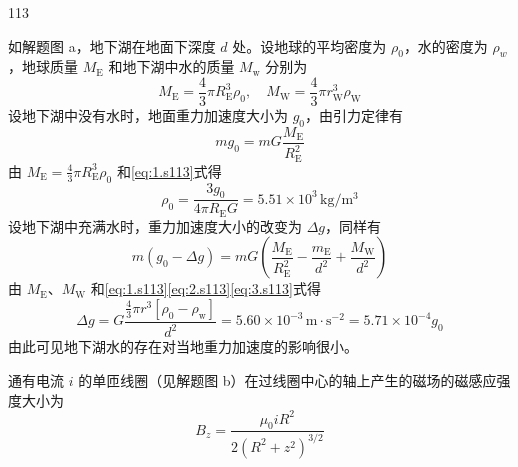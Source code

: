 \begin{solution}{113}
    \begin{subsolution}
        如解题图 a，地下湖在地面下深度 $d$ 处。设地球的平均密度为 $\rho_{0}$，水的密度为 $\rho_{w}$，地球质量 $M_{\mathrm{E}}$ 和地下湖中水的质量 $M_{\mathrm{w}}$ 分别为
        \begin{equation}
            M_{\mathrm{E}} = \frac{4}{3} \pi R_{\mathrm{E}}^{3} \rho_{0}, \quad M_{\mathrm{W}} = \frac{4}{3} \pi r_{\mathrm{W}}^{3} \rho_{\mathrm{W}}
        \end{equation}
        设地下湖中没有水时，地面重力加速度大小为 $g_{0}$，由引力定律有
        \begin{equation}
            m g_{0} = m G \frac{M_{\mathrm{E}}}{R_{\mathrm{E}}^{2}}
            \label{eq:1.s113}
        \end{equation}
        由 $M_{\mathrm{E}} = \frac{4}{3}\pi R_{\mathrm{E}}^{3}\rho_{0}$ 和\eqref{eq:1.s113}式得
        \begin{equation}
            \rho_{0} = \frac{3 g_{0}}{4 \pi R_{\mathrm{E}} G} = 5.51 \times 10^{3} \,\mathrm{kg/m^{3}}
            \label{eq:2.s113}
        \end{equation}
        设地下湖中充满水时，重力加速度大小的改变为 $\Delta g$，同样有
        \begin{equation}
            m (g_{0} - \Delta g) = m G \left(\frac{M_{\mathrm{E}}}{R_{\mathrm{E}}^{2}} - \frac{m_{\mathrm{E}}}{d^{2}} + \frac{M_{\mathrm{W}}}{d^{2}}\right)
            \label{eq:3.s113}
        \end{equation}
        由 $M_{\mathrm{E}}$、$M_{\mathrm{W}}$ 和\eqref{eq:1.s113}\eqref{eq:2.s113}\eqref{eq:3.s113}式得
        \begin{equation}
            \Delta g = G \frac{\frac{4}{3} \pi r^{3} [\rho_{0} - \rho_{\mathrm{w}}]}{d^{2}} = 5.60 \times 10^{-3} \,\mathrm{m\cdot s^{-2}} = 5.71 \times 10^{-4} g_{0}
            \label{eq:4.s113}
        \end{equation}
        由此可见地下湖水的存在对当地重力加速度的影响很小。
    \end{subsolution}
    \begin{subsolution}
        \begin{subsubsolution}
            通有电流 $i$ 的单匝线圈（见解题图 b）在过线圈中心的轴上产生的磁场的磁感应强度大小为
            \begin{equation}
                B_{z} = \frac{\mu_{0} i R^{2}}{2 (R^{2} + z^{2})^{3/2}}
            \end{equation}

\end{subsubsolution}
\end{subsolution}
\end{solution}

